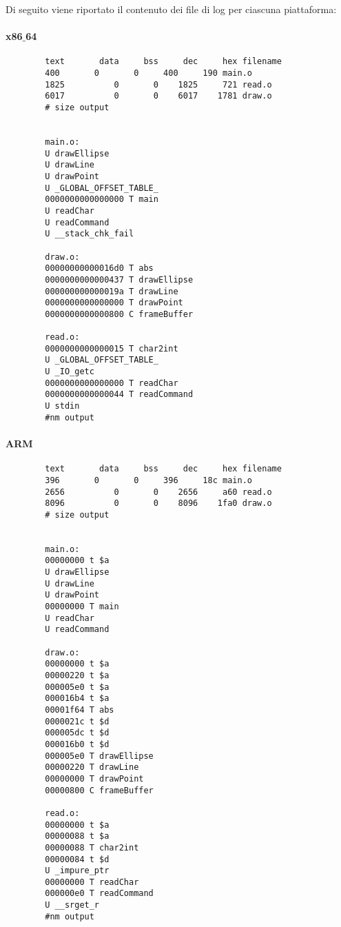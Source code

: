 \documentclass[a4paper]{article}
\begin{document}
Di seguito viene riportato il contenuto dei file di log per ciascuna piattaforma:
		\paragraph{x86$\_$64}
		\begin{center}
		\begin{lstlisting}
		text	   data	    bss	    dec	    hex	filename
		400	      0	      0	    400	    190	main.o
		1825	      0	      0	   1825	    721	read.o
		6017	      0	      0	   6017	   1781	draw.o
		# size output
		
		
		main.o:
		U drawEllipse
		U drawLine
		U drawPoint
		U _GLOBAL_OFFSET_TABLE_
		0000000000000000 T main
		U readChar
		U readCommand
		U __stack_chk_fail
		
		draw.o:
		00000000000016d0 T abs
		0000000000000437 T drawEllipse
		000000000000019a T drawLine
		0000000000000000 T drawPoint
		0000000000000800 C frameBuffer
		
		read.o:
		0000000000000015 T char2int
		U _GLOBAL_OFFSET_TABLE_
		U _IO_getc
		0000000000000000 T readChar
		0000000000000044 T readCommand
		U stdin
		#nm output
		\end{lstlisting}	
		\end{center}
		
		\paragraph{ARM}
		\begin{center}
		\begin{lstlisting}
		text	   data	    bss	    dec	    hex	filename
		396	      0	      0	    396	    18c	main.o
		2656	      0	      0	   2656	    a60	read.o
		8096	      0	      0	   8096	   1fa0	draw.o
		# size output
			
			
		main.o:
		00000000 t $a
		U drawEllipse
		U drawLine
		U drawPoint
		00000000 T main
		U readChar
		U readCommand
			
		draw.o:
		00000000 t $a
		00000220 t $a
		000005e0 t $a
		000016b4 t $a
		00001f64 T abs
		0000021c t $d
		000005dc t $d
		000016b0 t $d
		000005e0 T drawEllipse
		00000220 T drawLine
		00000000 T drawPoint
		00000800 C frameBuffer
		
		read.o:
		00000000 t $a
		00000088 t $a
		00000088 T char2int
		00000084 t $d
		U _impure_ptr
		00000000 T readChar
		000000e0 T readCommand
		U __srget_r
		#nm output
		\end{lstlisting}
		\end{center}
		
\end{document}
